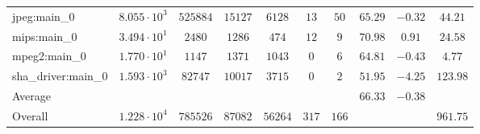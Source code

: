 \begin{tabular}{|l|c|c|c|c|c|c|c|c|c|}
jpeg:main\_0            & $ 8.055 \cdot 10^{3} $ & $ 525884 $ & $ 15127 $ & $ 6128  $ & $ 13  $ & $ 50  $ & $ 65.29       $ & $ -0.32   $ & $ 44.21   $ \\
mips:main\_0            & $ 3.494 \cdot 10^{1} $ & $ 2480   $ & $ 1286  $ & $ 474   $ & $ 12  $ & $ 9   $ & $ 70.98       $ & $ 0.91    $ & $ 24.58   $ \\
mpeg2:main\_0           & $ 1.770 \cdot 10^{1} $ & $ 1147   $ & $ 1371  $ & $ 1043  $ & $ 0   $ & $ 6   $ & $ 64.81       $ & $ -0.43   $ & $ 4.77    $ \\
sha\_driver:main\_0     & $ 1.593 \cdot 10^{3} $ & $ 82747  $ & $ 10017 $ & $ 3715  $ & $ 0   $ & $ 2   $ & $ 51.95       $ & $ -4.25   $ & $ 123.98  $ \\
\hline
Average                 & $                    $ & $        $ & $       $ & $       $ & $     $ & $     $ & $ 66.33       $ & $ -0.38   $ & $         $ \\
\hline
Overall                 & $ 1.228 \cdot 10^{4} $ & $ 785526 $ & $ 87082 $ & $ 56264 $ & $ 317 $ & $ 166 $ & $             $ & $         $ & $ 961.75  $ \\
\hline
\end{tabular}
